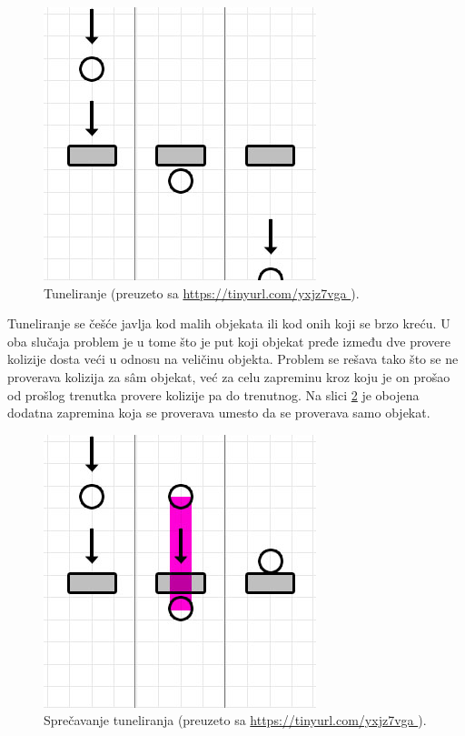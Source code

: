 \documentclass[12pt,oneside]{memoir}
\begin{document}
\begin{figure}[h!]
	\centering
	\includegraphics[scale=0.55]{tunnel.png}
	\caption{Tuneliranje (\tiny preuzeto sa \url{ https://tinyurl.com/yxjz7vga }).}
	
	\label{fig:tunnel}
\end{figure}

Tuneliranje se češće javlja kod malih objekata ili kod onih koji se brzo kreću.
U oba slučaja problem je u tome što je put koji objekat pređe između dve provere kolizije dosta veći u odnosu na veličinu objekta. 
Problem se rešava tako što se ne proverava kolizija za sâm objekat, već za celu zapreminu kroz koju je on prošao 
od prošlog trenutka provere kolizije pa do trenutnog. Na slici \ref{fig:tunnel_fix} je obojena dodatna zapremina 
koja se proverava umesto da se proverava samo objekat. 

\begin{figure}[h!]
	\centering
	\includegraphics[scale=0.55]{tunnel_fixed.png}
	\caption{Sprečavanje tuneliranja (\tiny preuzeto sa \url{ https://tinyurl.com/yxjz7vga }).}
	
	\label{fig:tunnel_fix}
\end{figure}
\end{document}
